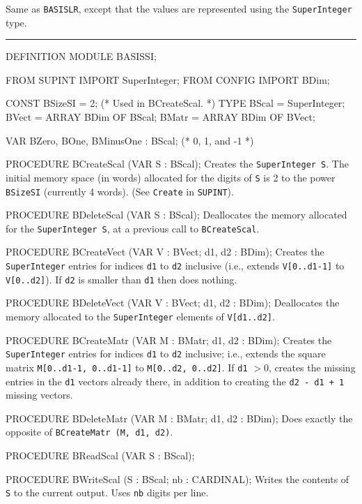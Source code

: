 
Same as {\tt BASISLR}, except that the values are
represented using the {\tt SuperInteger} type.

\bigskip\hrule
\code

DEFINITION MODULE BASISSI;

FROM SUPINT   IMPORT SuperInteger;
FROM CONFIG   IMPORT BDim;

CONST
   BSizeSI = 2;                        (* Used in BCreateScal.            *)
TYPE
   BScal   = SuperInteger;
   BVect   = ARRAY BDim OF BScal;
   BMatr   = ARRAY BDim OF BVect;

VAR
   BZero, BOne, BMinusOne : BScal;     (* 0, 1, and -1                    *)

PROCEDURE BCreateScal (VAR S : BScal);
\endcode
  \tab  Creates the {\tt SuperInteger S}.
   The initial memory space (in words)
   allocated for the digits of {\tt S} is 2 to the
   power {\tt BSizeSI} (currently 4 words).
   (See {\tt Create} in {\tt SUPINT}).\endtab
\code

PROCEDURE BDeleteScal (VAR S : BScal);
\endcode
  \tab  Deallocates the memory allocated for the {\tt SuperInteger S},
  at a previous call to {\tt BCreateScal}. \endtab
\code

PROCEDURE BCreateVect (VAR V : BVect; d1, d2 : BDim);
\endcode
  \tab  Creates the {\tt SuperInteger} entries for indices 
  {\tt d1}  to  {\tt d2} inclusive
  (i.e., extends {\tt V[0..d1-1]} to {\tt V[0..d2]}).
  If  {\tt d2} is smaller than  {\tt d1}  then does nothing. \endtab
\code

PROCEDURE BDeleteVect (VAR V : BVect; d1, d2 : BDim);
\endcode
  \tab  Deallocates the memory allocated to the {\tt SuperInteger}
  elements of {\tt V[d1..d2]}.
  \endtab
\code

PROCEDURE BCreateMatr (VAR M : BMatr; d1, d2 : BDim);
\endcode
  \tab  Creates the {\tt SuperInteger} entries for indices 
   {\tt d1}  to  {\tt d2} inclusive; i.e., extends the square matrix 
   {\tt M[0..d1-1, 0..d1-1]} to {\tt M[0..d2, 0..d2]}.
   If {\tt d1} $> 0$, creates the missing entries in the {\tt d1} 
   vectors already there, in addition to creating the {\tt d2 - d1 + 1}
   missing vectors.
\endtab
\code

PROCEDURE BDeleteMatr (VAR M : BMatr; d1, d2 : BDim);
\endcode
  \tab  Does exactly the opposite of {\tt BCreateMatr (M, d1, d2)}.
  \endtab
\code

PROCEDURE BReadScal (VAR S : BScal);

PROCEDURE BWriteScal (S : BScal;   nb : CARDINAL);
\endcode
  \tab  Writes the contents of {\tt S} to the current output.
        Uses {\tt nb} digits per line.  \endtab
\code

